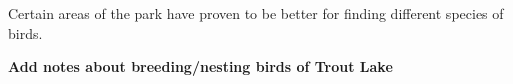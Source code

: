 Certain areas of the park have proven to be better for finding different species of birds. 

\textbf{Add notes about breeding/nesting birds of Trout Lake}
